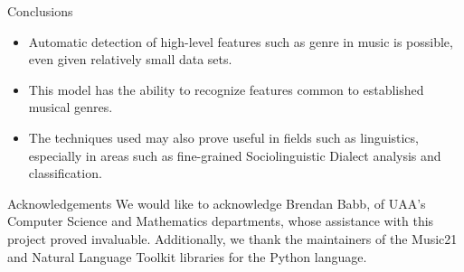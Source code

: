 \documentclass[final]{beamer}
\newlength{\onecolwid}
\begin{document}
\begin{frame}[t]
\begin{columns}[t]
\begin{column}{\onecolwid}
\begin{alertblock}{Conclusions}
\begin{itemize}
\item Automatic detection of high-level features such as genre in music is possible, even given relatively small data sets.
\item This model has the ability to recognize features common to established musical genres.
\item The techniques used may also prove useful in fields such as linguistics, especially in areas such as fine-grained Sociolinguistic Dialect analysis and classification.
\end{itemize}

\end{alertblock}
\begin{block}{Acknowledgements}
    We would like to acknowledge Brendan Babb, of UAA's Computer Science and Mathematics departments, whose assistance with this project proved invaluable. Additionally, we thank the maintainers of the Music21 and Natural Language Toolkit libraries for the Python language.
\end{block}

\end{column} %

\end{columns} %

\end{frame} 
\end{document}
